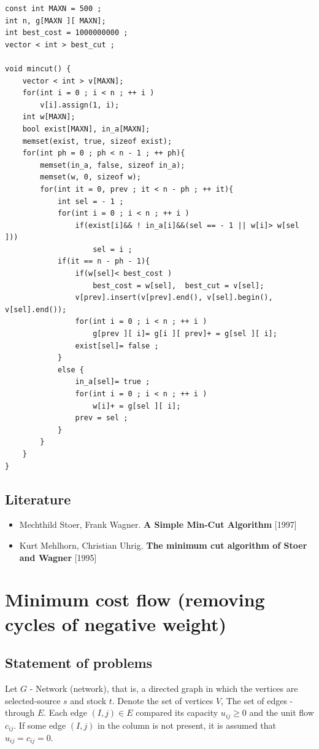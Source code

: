 \begin{verbatim}
const int MAXN = 500 ;
int n, g[MAXN ][ MAXN];
int best_cost = 1000000000 ;
vector < int > best_cut ;
 
void mincut() {
    vector < int > v[MAXN];
    for(int i = 0 ; i < n ; ++ i )
        v[i].assign(1, i);
    int w[MAXN];
    bool exist[MAXN], in_a[MAXN];
    memset(exist, true, sizeof exist);
    for(int ph = 0 ; ph < n - 1 ; ++ ph){
        memset(in_a, false, sizeof in_a);
        memset(w, 0, sizeof w);
        for(int it = 0, prev ; it < n - ph ; ++ it){
            int sel = - 1 ;
            for(int i = 0 ; i < n ; ++ i )
                if(exist[i]&& ! in_a[i]&&(sel == - 1 || w[i]> w[sel ]))
                    sel = i ;
            if(it == n - ph - 1){
                if(w[sel]< best_cost )
                    best_cost = w[sel],  best_cut = v[sel];
                v[prev].insert(v[prev].end(), v[sel].begin(), v[sel].end());
                for(int i = 0 ; i < n ; ++ i )
                    g[prev ][ i]= g[i ][ prev]+ = g[sel ][ i];
                exist[sel]= false ;
            }
            else {
                in_a[sel]= true ;
                for(int i = 0 ; i < n ; ++ i )
                    w[i]+ = g[sel ][ i];
                prev = sel ;
            }
        }
    }
} 
\end{verbatim}
\subsection{ Literature }

\begin{itemize} \item Mechthild Stoer, Frank Wagner. \textbf{A Simple Min-Cut Algorithm} [1997] \item Kurt Mehlhorn, Christian Uhrig. \textbf{The minimum cut algorithm of Stoer and Wagner} [1995] \end{itemize}

\section{ Minimum cost flow (removing cycles of negative weight) }
\subsection{ Statement of problems }

Let $G$ - Network (network), that is, a directed graph in which the vertices are selected-source $s$ and stock $t$. Denote the set of vertices $V$, The set of edges - through $E$. Each edge $(I, j) \in E$ compared its capacity $u_ {ij} \ge 0$ and the unit flow $c_ {ij}$. If some edge $(I, j)$ in the column is not present, it is assumed that $u_ {ij} = c_ {ij} = 0$.


